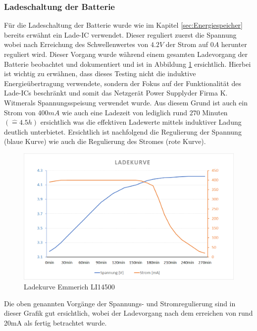 \subsubsection*{Ladeschaltung der Batterie}\label{sec:batterie}
Für die Ladeschaltung der Batterie wurde wie im Kapitel \ref{sec:Energiespeicher} bereits erwähnt ein Lade-IC verwendet. Dieser reguliert zuerst die Spannung wobei nach Erreichung des Schwellenwertes von $4.2V$ der Strom auf $0A$ herunter reguliert wird. Dieser Vorgang wurde während einem gesamten Ladevorgang der Batterie beobachtet und dokumentiert und ist in Abbildung \ref{fig:LadekurveEmmerich} ersichtlich. Hierbei ist wichtig zu erwähnen, dass dieses Testing nicht die induktive Energieübertragung verwendete, sondern der Fokus auf der Funktionalität des Lade-ICs beschränkt und somit das Netzgerät \glqq Power Supply\grqq\space der Firma \glqq K. Witmer\grqq\space als Spannungsspeisung verwendet wurde. Aus diesem Grund ist auch ein Strom von $400mA$ wie auch eine Ladezeit von lediglich rund $270$ Minuten $(\hat{=} 4.5h)$ ersichtlich was die effektiven Ladewerte mittels induktiver Ladung deutlich unterbietet. Ersichtlich ist nachfolgend die Regulierung der Spannung (blaue Kurve) wie auch die Regulierung des Stromes (rote Kurve).

\begin{figure}[H]
	\begin{center}
		\includegraphics[width=120mm]{data/LadekurveEmmerich.png}
		\caption[Ladekurve Emmerich LI14500]{Ladekurve Emmerich LI14500} %
		\label{fig:LadekurveEmmerich}
	\end{center}
\end{figure}

Die oben genannten Vorgänge der Spannungs- und Stromregulierung sind in dieser Grafik gut ersichtlich, wobei der Ladevorgang nach dem erreichen von rund 20mA als fertig betrachtet wurde.

